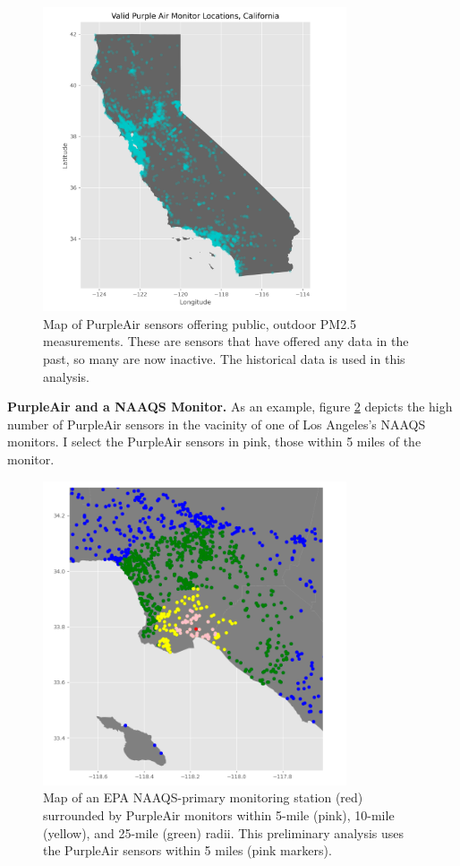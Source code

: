 \documentclass[12pt]{article}
\begin{document}
\FloatBarrier
\begin{figure}[ht]
\centering
\includegraphics[width=0.8\textwidth]{purple_air_sensor_map_california.png}
\caption{Map of PurpleAir sensors offering public, outdoor PM2.5 measurements. These are sensors that have offered any data in the past, so many are now inactive. The historical data is used in this analysis.}
\label{fig:ca_purpleair_map}
\end{figure}

\FloatBarrier
\textbf{PurpleAir and a NAAQS Monitor.} As an example, figure \ref{fig:concentric_purpleair_037-4004} depicts the high number of PurpleAir sensors in the vacinity of one of Los Angeles's NAAQS monitors. I select the PurpleAir sensors in pink, those within 5 miles of the monitor.
\begin{figure}[ht]
\centering
\includegraphics[width=0.8\textwidth]{county-037_site-4004_epa-pa-concentric-ranges.png}
\caption{Map of an EPA NAAQS-primary monitoring station (red) surrounded by PurpleAir monitors within 5-mile (pink), 10-mile (yellow), and 25-mile (green) radii. This preliminary analysis uses the PurpleAir sensors within 5 miles (pink markers).}
\label{fig:concentric_purpleair_037-4004}
\end{figure}
\end{document}
